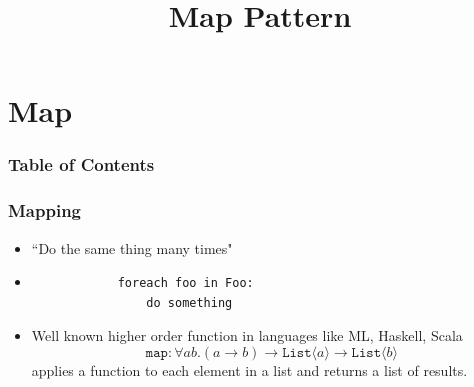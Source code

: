 \documentclass[xcolor=dvipsnames]{beamer}
\begin{document}
	\title[Map Pattern]{Map Pattern}
	\author[]{\className}
	\institute[\className]{\departmentName}
	\date{} 


	\begin{frame}
		\maketitle
	\end{frame}


\section{Map} 

	\begin{frame} \frametitle{Table of Contents}
		\tableofcontents[currentsection]
	\end{frame} 
	
	
	
		\begin{frame}[fragile] \frametitle{Mapping}
		\begin{itemize}
			\item ``Do the same thing many times"
			\item \begin{verbatim}
			foreach foo in Foo:
			    do something
			\end{verbatim}
			\item Well known higher order function in languages like ML, Haskell, Scala
			\[ \texttt{map} : \forall a b. (a \to b) \to \texttt{List}\langle a\rangle \to \texttt{List}\langle b\rangle \]
			applies a function to each element in a list and returns a list of results.\\
		\end{itemize}
		\end{frame}
		
\end{document}
